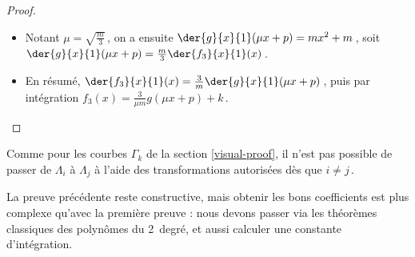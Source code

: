 \begin{proof}
\begin{enumerate}
\begin{itemize}
		      		\item Notant $\mu = \sqrt{\frac{m}{3}}$\,, on a ensuite
				          $\der{g}{x}{1}(\mu x + p) = m x^2 + m$\,,
				          soit
				          $\der{g}{x}{1}(\mu x + p) = \frac{m}{3} \der{f_3}{x}{1}(x)$\,.

		      		\item En résumé,
				          $\der{f_3}{x}{1}(x) = \frac{3}{m} \der{g}{x}{1}(\mu x + p)$\,,
				          puis par intégration
				          $f_3(x) = \frac{3}{\mu m} g(\mu x + p) + k$\,.
		      \end{itemize}
	\end{enumerate}
\end{proof}




\medskip

Comme pour les courbes $\Gamma_k$ de la section \ref{visual-proof}, il n'est pas possible de passer de $\Lambda_i$  à $\Lambda_j$ à l'aide des transformations autorisées dès que $i \neq j$\,.




\begin{remark}
	La preuve précédente reste constructive, mais obtenir les bons coefficients est plus complexe qu'avec la première preuve : nous devons passer via les théorèmes classiques des polynômes du 2\ieme\ degré, et aussi calculer une constante d'intégration.
\end{remark}